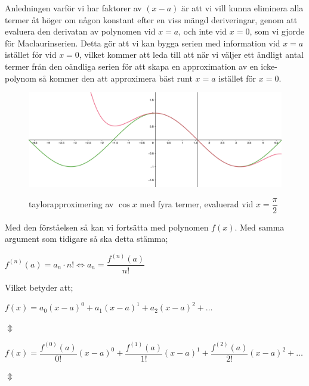 \documentclass[10pt, a4paper]{amsart}
\begin{document}
Anledningen varför vi har faktorer av $ (x - a) $ är att vi vill kunna eliminera alla termer åt höger om någon konstant efter en viss mängd deriveringar, 
genom att evaluera den derivatan av polynomen vid $ x = a $, och inte vid $ x = 0 $, som vi gjorde för Maclaurinserien. 
Detta gör att vi kan bygga serien med information vid $ x = a $ istället för vid $ x = 0 $, 
vilket kommer att leda till att när vi väljer ett ändligt antal termer från den oändliga serien för att skapa en approximation av en icke-polynom så kommer den att approximera bäst runt $ x = a $ istället för $ x = 0 $.

\begin{figure}[ht!]
    \includegraphics[width=\linewidth]{photos/chapter1/5.png}
    \centerline{taylorapproximering av $ \cos x $ med fyra termer, evaluerad vid $ x = \dfrac{\pi}{2} $}
\end{figure}
\bigskip

Med den förståelsen så kan vi fortsätta med polynomen $ f(x) $. Med samma argument som tidigare så ska detta stämma;
\vspace{24pt plus 4pt minus 4pt}

\bigskip
\hspace{5ex}
$ f^{(n)}(a) = a_n \cdot n! \iff a_n = \dfrac{f^{(n)}(a)}{n!} $ 
\vspace{24pt plus 4pt minus 4pt}

Vilket betyder att;
\vspace{24pt plus 4pt minus 4pt}

\hspace{5ex}
$ f(x) = a_0(x-a)^0 + a_1(x-a)^1 + a_2(x-a)^2 + \dotso $
\bigskip 

\hspace{10ex}
$ \Updownarrow $
\bigskip

\hspace{5ex}
$ f(x) = \dfrac{f^{(0)}(a)}{0!}(x-a)^0 + \dfrac{f^{(1)}(a)}{1!}(x-a)^1 + \dfrac{f^{(2)}(a)}{2!}(x-a)^2 + \dotso $
\bigskip

\hspace{10ex}
$ \Updownarrow $
\bigskip
\end{document}
